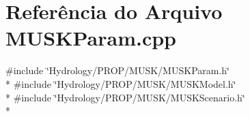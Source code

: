 \section{Referência do Arquivo M\+U\+S\+K\+Param.\+cpp}
\label{_m_u_s_k_param_8cpp}
{\ttfamily \#include \char`\"{}Hydrology/\+P\+R\+O\+P/\+M\+U\+S\+K/\+M\+U\+S\+K\+Param.\+h\char`\"{}}\\*
{\ttfamily \#include \char`\"{}Hydrology/\+P\+R\+O\+P/\+M\+U\+S\+K/\+M\+U\+S\+K\+Model.\+h\char`\"{}}\\*
{\ttfamily \#include \char`\"{}Hydrology/\+P\+R\+O\+P/\+M\+U\+S\+K/\+M\+U\+S\+K\+Scenario.\+h\char`\"{}}\\*
